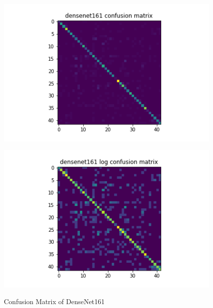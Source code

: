\begin{figure}[H]
\begin{minipage}[b]{.5\linewidth}
    {\includegraphics[width=1.2\textwidth]{figs/conf_matrix/densenet161_conf.png}}
  \end{minipage}
  \hfill
  \begin{minipage}[b]{.5\linewidth}
    \centering

    {\includegraphics[width=1.2\textwidth]{figs/conf_matrix/densenet161_log_conf.png}}
  \end{minipage}

  \caption{Confusion Matrix of DenseNet161}
  \label{fig:densenet161_conf}
  \vspace{0.2in}
\end{figure}

